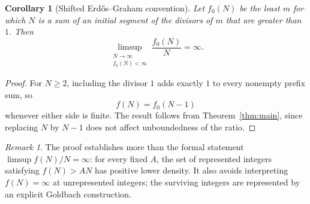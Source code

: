 \documentclass[11pt]{article}
\newtheorem{corollary}[theorem]{Corollary}
\theoremstyle{definition}
\theoremstyle{remark}
\newtheorem{remark}[theorem]{Remark}
\begin{document}
\begin{corollary}[Shifted Erd\H{o}s--Graham convention]
Let $f_0(N)$ be the least $m$ for which $N$ is a sum of an initial segment of the divisors of $m$ that are greater than $1$.  Then
\[
\limsup_{\substack{N\to\infty\\f_0(N)<\infty}}\frac{f_0(N)}N=\infty.
\]
\end{corollary}

\begin{proof}
For $N\geq2$, including the divisor $1$ adds exactly $1$ to every nonempty prefix sum, so
\[
f(N)=f_0(N-1)
\]
whenever either side is finite.  The result follows from Theorem~\ref{thm:main}, since replacing $N$ by $N-1$ does not affect unboundedness of the ratio.
\end{proof}

\begin{remark}
The proof establishes more than the formal statement $\limsup f(N)/N=\infty$: for every fixed $A$, the set of represented integers satisfying $f(N)>AN$ has positive lower density.  It also avoids interpreting $f(N)=\infty$ at unrepresented integers; the surviving integers are represented by an explicit Goldbach construction.
\end{remark}
\end{document}
